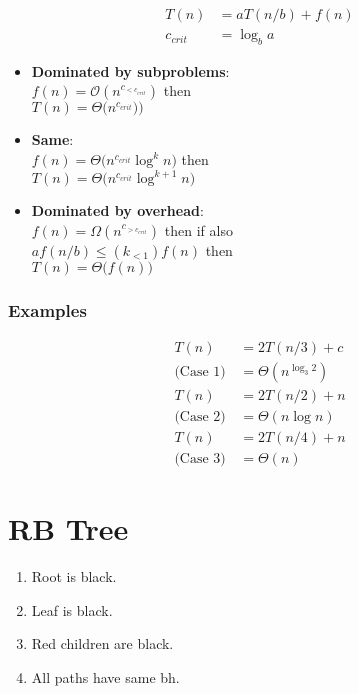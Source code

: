\documentclass[11pt]{article}
\begin{document}
\begin{multicols}{4}
\begin{align*}
	T(n) &= aT(n/b) + f(n) \\
	c_{crit} &= \log_{b}{a}
\end{align*}

\begin{itemize}
	\item \textbf{Dominated by subproblems}: \\
		$f(n) = \mathcal{O}(n^{c_{< c_{crit}}})$ then \\
		$T(n) = \Theta\bigl(n^{c_{crit}})\bigr)$

	\item \textbf{Same}: \\
		$f(n) = \Theta\bigl(n^{c_{crit}} \log^k{n}\bigr)$ then \\
		$T(n) = \Theta\bigl(n^{c_{crit}}\log^{k+1}{n}\bigr)$

	\item \textbf{Dominated by overhead}: \\
		$f(n) = \Omega(n^{c_{> c_{crit}}})$ then if also \\
		$af(n/b) \le (k_{<1})f(n)$ then \\
		$T(n) = \Theta\bigl(f(n)\bigr)$
\end{itemize}

\subsubsection{Examples}

\begin{align*}
	T(n) &= 2T(n/3) + c \\
	\text{(Case 1)} \,
	&= \Theta(n^{\log_3{2}})
	\\
	T(n) &= 2T(n/2) + n \\
	\text{(Case 2)} \,
	&= \Theta(n\log{n})
	\\
	T(n) &= 2T(n/4) + n \\
	\text{(Case 3)} \,
	&= \Theta(n)
\end{align*}

\section{RB Tree}

\begin{enumerate}
	\item Root is black.
	\item Leaf is black.
	\item Red children are black.
	\item All paths have same bh.
\end{enumerate}


\end{multicols}
\end{document}
